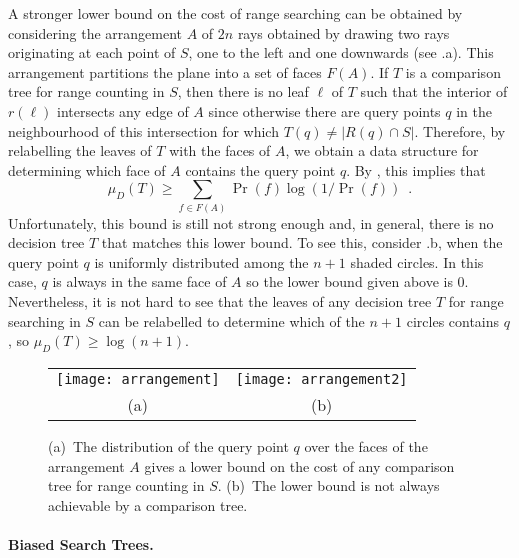 \documentclass[charterfonts]{patmorin}
\begin{document}
A stronger lower bound on the cost of range searching can be obtained
by considering the arrangement $A$ of $2n$ rays obtained by drawing
two rays originating at each point of $S$, one to the left and one
downwards (see .a).  This arrangement partitions
the plane into a set of faces $F(A)$.  If $T$ is a comparison tree for
range counting in $S$, then there is no leaf $\ell$ of $T$ such that
the interior of $r(\ell)$ intersects any edge of $A$ since otherwise
there are query points $q$ in the neighbourhood of this intersection
for which $T(q)\neq |R(q)\cap S|$.  Therefore, by relabelling the leaves
of $T$ with the faces of $A$, we obtain a data structure for
determining which face of $A$ contains the query point $q$.
By , this implies that
\[
   \mu_D(T) \ge \sum_{f\in F(A)} \Pr(f)\log(1/\Pr(f)) \enspace .
\]
Unfortunately, this bound is still not strong enough and, in general,
there is no decision tree $T$ that matches this lower bound.  To see
this, consider .b, when the query point $q$ is
uniformly distributed among the $n+1$ shaded circles.  In this case,
$q$ is always in the same face of $A$ so the lower bound given above
is 0.  Nevertheless, it is not hard to see that the leaves of
any decision tree $T$ for range searching in $S$ can be relabelled to
determine which of the $n+1$ circles contains $q$, so $\mu_D(T) \ge
\log(n+1)$.

\begin{figure}
  \begin{center}
    \begin{tabular}{cc}
      \texttt{[image: arrangement]} &
      \texttt{[image: arrangement2]} \\
        (a) & (b)
    \end{tabular}
  \end{center}
  \caption{(a)~The distribution of the query point $q$ over the faces
     of the arrangement $A$ gives a lower bound on the cost of any
     comparison tree for range counting in $S$. (b)~The lower bound is
     not always achievable by a comparison tree.}
\end{figure}

\paragraph{Biased Search Trees.}
\end{document}
